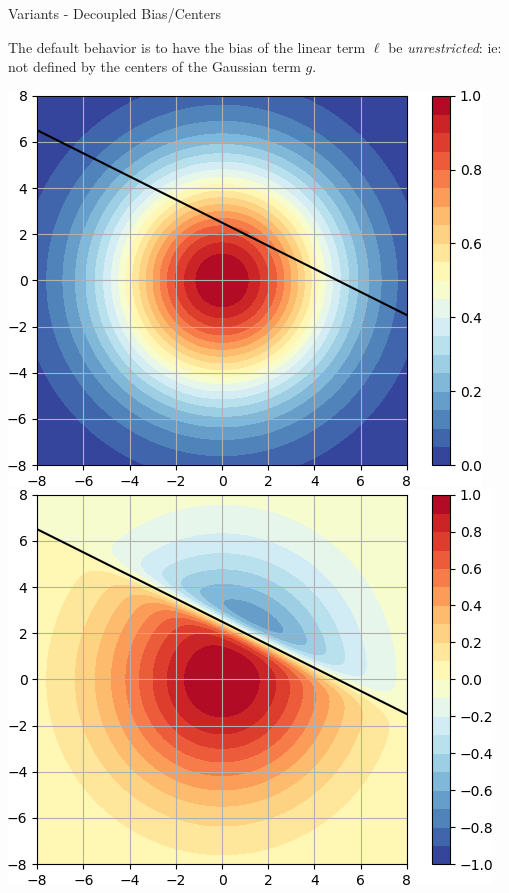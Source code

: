 \documentclass{beamer}
\begin{document}
\begin{frame}{Variants - Decoupled Bias/Centers}

    \begin{block}{}
    The default behavior is to have the bias of the linear term $\ell$ be \emph{unrestricted}: ie: not defined by the centers of the Gaussian term $g$.
    \end{block}
    
    \vspace{0.4cm}
    
    \centering
    \includegraphics[height=0.5\textheight]{images/2D-Decoupled/var-decoupled-center-g-cropped.png}
    \includegraphics[height=0.5\textheight]{images/2D-Decoupled/var-decoupled-center-activity-cropped.png}\\
    
\end{frame}
\end{document}
